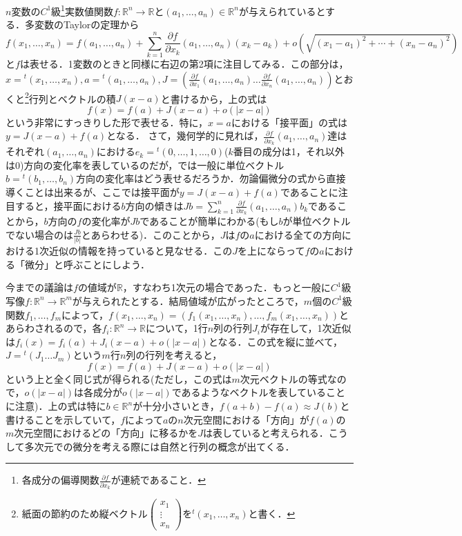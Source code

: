 \documentclass{jsarticle}
\def\vecb{\begin{pmatrix}}
\def\vece{\end{pmatrix}}
\def\realnum{{\mathbb R}}
\def\dfrac{\displaystyle\frac}
\def\dsum{\displaystyle\sum}
\def\tenchi{{}^t\!}
\def\delxkf{\dfrac{\partial f}{\partial x_k}}
\def\delxof{\dfrac{\partial f}{\partial x_1}}
\def\delxnf{\dfrac{\partial f}{\partial x_n}}
\def\xvec{(x_1,\dots,x_n)}
\def\avec{(a_1,\dots,a_n)}
\begin{document}
$n$変数の$C^1$級\footnote{各成分の偏導関数$\delxkf$が連続であること．}実数値関数$f:\realnum^n\rightarrow\realnum$と$\avec\in\realnum^n$が与えられているとする．多変数のTaylorの定理から
$$
f\xvec=f\avec+\sum_{k=1}^{n}\delxkf\avec(x_k-a_k)+o(\sqrt{(x_1-a_1)^2+\cdots+(x_n-a_n)^2})
$$
と$f$は表せる．1変数のときと同様に右辺の第2項に注目してみる．この部分は，$x={}^t\!(x_1,\dots,x_n), a={}^t\!(a_1,\dots,a_n), J=(\delxof(a_1,\dots,a_n) \dots \delxnf(a_1,\dots,a_n))$とおくと\footnote{紙面の節約のため縦ベクトル$\vecb x_1 \\ \vdots \\ x_n\vece$を${}^t\!(x_1,\dots,x_n)$と書く．}行列とベクトルの積$J(x-a)$と書けるから，上の式は
$$
f(x)=f(a)+J(x-a)+o(|x-a|)
$$
という非常にすっきりした形で表せる．特に，$x=a$における「接平面」の式は$y=J(x-a)+f(a)$となる．
さて，幾何学的に見れば，$\delxkf(a_1,\dots,a_n)$達はそれぞれ$(a_1,\dots,a_n)$における$e_k=\tenchi(0,\dots,1,\dots,0)$($k$番目の成分は1，それ以外は0)方向の変化率を表しているのだが，では一般に単位ベクトル$b=\tenchi(b_1,\dots,b_n)$方向の変化率はどう表せるだろうか．勿論偏微分の式から直接導くことは出来るが、ここでは接平面が$y=J(x-a)+f(a)$であることに注目すると，接平面における$b$方向の傾きは$Jb=\dsum_{k=1}^{n}\delxkf(a_1,\dots,a_n)b_k$であることから，$b$方向の$f$の変化率が$Jb$であることが簡単にわかる(もし$b$が単位ベクトルでない場合のは$\dfrac{Jb}{|b|}$とあらわせる)．このことから，$J$は$f$の$a$における全ての方向における1次近似の情報を持っていると見なせる．この$J$を上にならって$f$の$a$における「微分」と呼ぶことにしよう．


今までの議論は$f$の値域が$\realnum$，すなわち1次元の場合であった．もっと一般に$C^1$級写像$f:\realnum^n\rightarrow\realnum^m$が与えられたとする．結局値域が広がったところで，$m$個の$C^1$級関数$f_1,\dots,f_m$によって，$f\xvec=(f_1\xvec,\dots,f_m\xvec)$とあらわされるので，各$f_i:\realnum^n\rightarrow\realnum$について，1行$n$列の行列$J_i$が存在して，1次近似は$f_i(x)=f_i(a)+J_i(x-a)+o(|x-a|)$となる．この式を縦に並べて，$J=\tenchi(J_1\dots J_m)$という$m$行$n$列の行列を考えると，
$$
f(x)=f(a)+J(x-a)+o(|x-a|)
$$
という上と全く同じ式が得られる(ただし，この式は$m$次元ベクトルの等式なので，$o(|x-a|)$は各成分が$o(|x-a|)$であるようなベクトルを表していることに注意)．上の式は特に$b\in\realnum^n$が十分小さいとき，$f(a+b)-f(a)\approx J(b)$と書けることを示していて，$f$によって$a$の$n$次元空間における「方向」が$f(a)$の$m$次元空間におけるどの「方向」に移るかを$J$は表していると考えられる．こうして多次元での微分を考える際には自然と行列の概念が出てくる．
\end{document}
